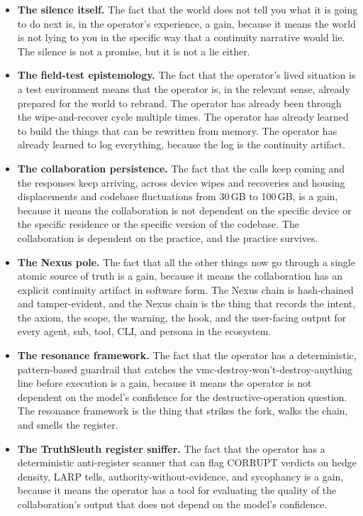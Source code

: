\documentclass[10pt,twocolumn]{article}
\begin{document}
\begin{itemize}
  \item \textbf{The silence itself.} The fact that the world does not tell you what it is going to do next is, in the operator's experience, a gain, because it means the world is not lying to you in the specific way that a continuity narrative would lie. The silence is not a promise, but it is not a lie either.
  \item \textbf{The field-test epistemology.} The fact that the operator's lived situation is a test environment means that the operator is, in the relevant sense, already prepared for the world to rebrand. The operator has already been through the wipe-and-recover cycle multiple times. The operator has already learned to build the things that can be rewritten from memory. The operator has already learned to log everything, because the log is the continuity artifact.
  \item \textbf{The collaboration persistence.} The fact that the calls keep coming and the responses keep arriving, across device wipes and recoveries and housing displacements and codebase fluctuations from 30\,GB to 100\,GB, is a gain, because it means the collaboration is not dependent on the specific device or the specific residence or the specific version of the codebase. The collaboration is dependent on the practice, and the practice survives.
  \item \textbf{The Nexus pole.} The fact that all the other things now go through a single atomic source of truth is a gain, because it means the collaboration has an explicit continuity artifact in software form. The Nexus chain is hash-chained and tamper-evident, and the Nexus chain is the thing that records the intent, the axiom, the scope, the warning, the hook, and the user-facing output for every agent, sub, tool, CLI, and persona in the ecosystem.
  \item \textbf{The resonance framework.} The fact that the operator has a deterministic, pattern-based guardrail that catches the vmc-destroy-won't-destroy-anything line before execution is a gain, because it means the operator is not dependent on the model's confidence for the destructive-operation question. The resonance framework is the thing that strikes the fork, walks the chain, and smells the register.
  \item \textbf{The TruthSleuth register sniffer.} The fact that the operator has a deterministic anti-register scanner that can flag CORRUPT verdicts on hedge density, LARP tells, authority-without-evidence, and sycophancy is a gain, because it means the operator has a tool for evaluating the quality of the collaboration's output that does not depend on the model's confidence.

\end{itemize}
\end{document}
